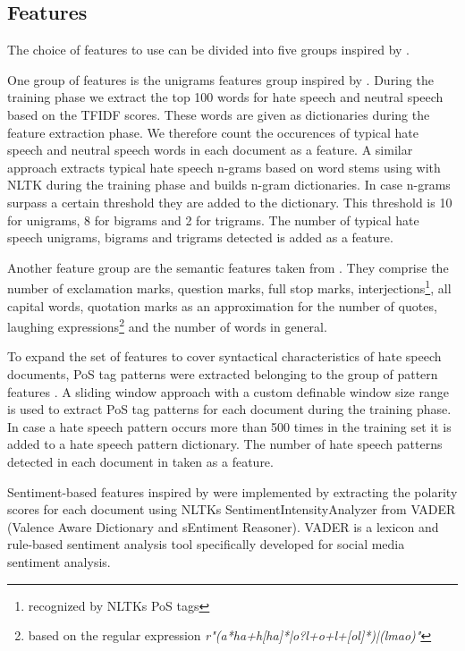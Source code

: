 \subsection{Features}
\label{ch:approachC}

The choice of features to use can be divided into five groups inspired by \cite{Watanabe2018}. 

One group of features is the unigrams features group inspired by \cite{ThomasDavidson2020, Oriola2020, Fortuna2018, Gaydhani2018, Malmasi2017}. During the training phase we extract the top 100 words for hate speech and neutral speech based on the TFIDF scores. These words are given as dictionaries during the feature extraction phase. We therefore count the occurences of typical hate speech and neutral speech words in each document as a feature. A similar approach extracts typical hate speech n-grams based on word stems using with NLTK during the training phase and builds n-gram dictionaries. In case n-grams surpass a certain threshold they are added to the dictionary. This threshold is 10 for unigrams, 8 for bigrams and 2 for trigrams. The number of typical hate speech unigrams, bigrams and trigrams detected is added as a feature. 

Another feature group are the semantic features taken from \cite{ThomasDavidson2020, Watanabe2018}. They comprise the number of exclamation marks, question marks, full stop marks, interjections\footnote{recognized by NLTKs PoS tags}, all capital words, quotation marks as an approximation for the number of quotes, laughing expressions\footnote{based on the regular expression \textit{r"(a*ha+h[ha]*|o?l+o+l+[ol]*)|(lmao)"}} and the number of words in general. 

To expand the set of features to cover syntactical characteristics of hate speech documents, PoS tag patterns were extracted belonging to the group of pattern features \cite{Oriola2020, Fortuna2018}. A sliding window approach with a custom definable window size range is used to extract PoS tag patterns for each document during the training phase. In case a hate speech pattern occurs more than 500 times in the training set it is added to a hate speech pattern dictionary. The number of hate speech patterns detected in each document in taken as a feature.

Sentiment-based features inspired by \cite{Oriola2020, Fortuna2018} were implemented by extracting the polarity scores for each document using NLTKs SentimentIntensityAnalyzer from VADER (Valence Aware Dictionary and sEntiment Reasoner). VADER is a lexicon and rule-based sentiment analysis tool specifically developed for social media sentiment analysis. 


